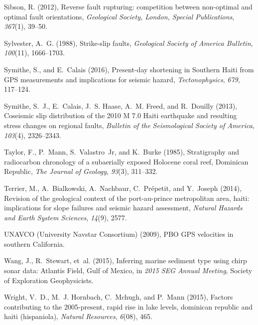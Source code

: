 \documentclass[linenumbers,draft]{agujournal}
\begin{document}
\begin{thebibliography}{65}
Sibson, R. (2012), Reverse fault rupturing: competition between non-optimal and
  optimal fault orientations, \textit{Geological Society, London, Special
  Publications}, \textit{367}(1), 39--50.

Sylvester, A.~G. (1988), Strike-slip faults, \textit{Geological Society of
  America Bulletin}, \textit{100}(11), 1666--1703.

Symithe, S., and E.~Calais (2016), {Present-day shortening in Southern Haiti
  from GPS measurements and implications for seismic hazard},
  \textit{Tectonophysics}, \textit{679}, 117--124.

Symithe, S.~J., E.~Calais, J.~S. Haase, A.~M. Freed, and R.~Douilly (2013),
  {Coseismic slip distribution of the 2010 M 7.0 Haiti earthquake and resulting
  stress changes on regional faults}, \textit{Bulletin of the Seismological
  Society of America}, \textit{103}(4), 2326--2343.

Taylor, F., P.~Mann, S.~Valastro~Jr, and K.~Burke (1985), Stratigraphy and
  radiocarbon chronology of a subaerially exposed {Holocene coral reef,
  Dominican Republic}, \textit{The Journal of Geology}, \textit{93}(3),
  311--332.

Terrier, M., A.~Bialkowski, A.~Nachbaur, C.~Pr{\'e}petit, and Y.~Joseph (2014),
  Revision of the geological context of the port-au-prince metropolitan area,
  haiti: implications for slope failures and seismic hazard assessment,
  \textit{Natural Hazards and Earth System Sciences}, \textit{14}(9), 2577.

{UNAVCO (University Navstar Consortium)} (2009), {PBO GPS velocities in
  southern California}.

Wang, J., R.~Stewart, et~al. (2015), Inferring marine sediment type using chirp
  sonar data: {Atlantis Field, Gulf of Mexico}, in \textit{2015 SEG Annual
  Meeting}, Society of Exploration Geophysicists.

Wright, V.~D., M.~J. Hornbach, C.~Mchugh, and P.~Mann (2015), Factors
  contributing to the 2005-present, rapid rise in lake levels, dominican
  republic and haiti (hispaniola), \textit{Natural Resources}, \textit{6}(08),
  465.

\end{thebibliography}
\end{document}

